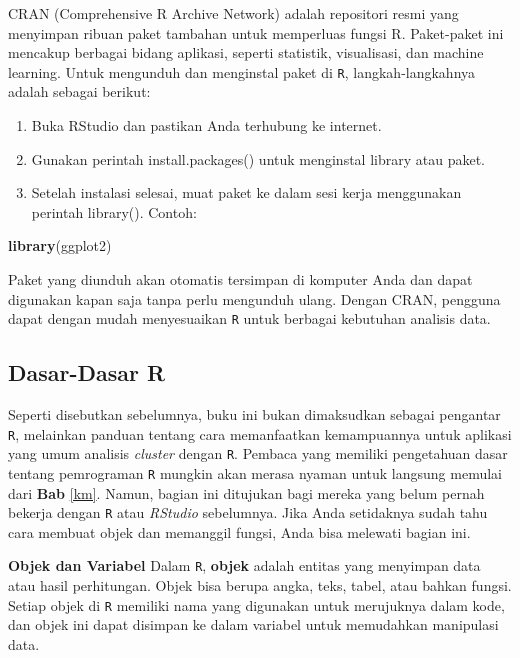 \documentclass[
  oneside]{book}
\newenvironment{Shaded}{\begin{snugshade}}{\end{snugshade}}
\newcommand{\FunctionTok}[1]{\textcolor[rgb]{0.13,0.29,0.53}{\textbf{#1}}}
\newcommand{\NormalTok}[1]{#1}
\begin{document}
CRAN (Comprehensive R Archive Network) adalah repositori resmi yang
menyimpan ribuan paket tambahan untuk memperluas fungsi R. Paket-paket
ini mencakup berbagai bidang aplikasi, seperti statistik, visualisasi,
dan machine learning. Untuk mengunduh dan menginstal paket di
\texttt{R}, langkah-langkahnya adalah sebagai berikut:

\begin{enumerate}
\def\labelenumi{\arabic{enumi}.}
\item
  Buka RStudio dan pastikan Anda terhubung ke internet.
\item
  Gunakan perintah install.packages() untuk menginstal library atau
  paket.
\item
  Setelah instalasi selesai, muat paket ke dalam sesi kerja
  menggunakan perintah library(). Contoh:
\end{enumerate}

\begin{Shaded}
\begin{Highlighting}[]
\FunctionTok{library}\NormalTok{(ggplot2)}
\end{Highlighting}
\end{Shaded}

Paket yang diunduh akan otomatis tersimpan di komputer Anda dan dapat
digunakan kapan saja tanpa perlu mengunduh ulang. Dengan CRAN, pengguna
dapat dengan mudah menyesuaikan \texttt{R} untuk berbagai kebutuhan
analisis data.

\subsection*{Dasar-Dasar R}\label{dasar-dasar-r}

Seperti disebutkan sebelumnya, buku ini bukan dimaksudkan sebagai
pengantar \texttt{R}, melainkan panduan tentang cara memanfaatkan
kemampuannya untuk aplikasi yang umum analisis \emph{cluster} dengan
\texttt{R}. Pembaca yang memiliki pengetahuan dasar tentang
pemrograman \texttt{R} mungkin akan merasa nyaman untuk langsung
memulai dari \textbf{Bab} \ref{km}. Namun, bagian ini ditujukan bagi mereka
yang belum pernah bekerja dengan \texttt{R} atau \emph{RStudio}
sebelumnya. Jika Anda setidaknya sudah tahu cara membuat objek dan
memanggil fungsi, Anda bisa melewati bagian ini.

\textbf{Objek dan Variabel} Dalam \texttt{R}, \textbf{objek} adalah entitas
yang menyimpan data atau hasil perhitungan. Objek bisa berupa angka,
teks, tabel, atau bahkan fungsi. Setiap objek di \texttt{R}
memiliki nama yang digunakan untuk merujuknya dalam kode, dan objek ini
dapat disimpan ke dalam variabel untuk memudahkan manipulasi data.
\end{document}
